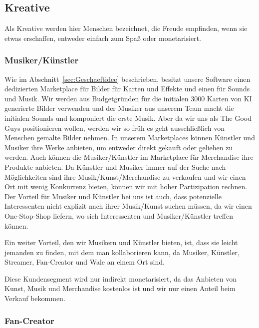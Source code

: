 \documentclass[fontsize=12, a4aper]{scrartcl}
\begin{document}
\subsection{Kreative} \label{subsec:Kreative}

Als Kreative werden hier Menschen bezeichnet, die Freude empfinden, wenn sie etwas erschaffen, entweder einfach zum Spaß oder monetarisiert.

\subsubsection{Musiker/Künstler} \label{subsubsec:Musiker_Kuenstler}

Wie im Abschnitt~\ref{sec:Geschaeftidee} beschrieben, besitzt unsere Software einen dedizierten Marketplace für Bilder für Karten und Effekte und einen für Sounds und Musik. Wir werden aus Budgetgründen für die initialen 3000 Karten von KI generierte Bilder verwenden und der Musiker aus unserem Team macht die initialen Sounds und komponiert die erste Musik. Aber da wir uns als \glqq The Good Guys\grqq{} positionieren wollen, werden wir so früh es geht ausschließlich von Menschen gemalte Bilder nehmen. In unserem Marketplaces können Künstler und Musiker ihre Werke anbieten, um entweder direkt gekauft oder geliehen zu werden. Auch können die Musiker/Künstler im Marketplace für Merchandise ihre Produkte anbieten. Da Künstler und Musiker immer auf der Suche nach Möglichkeiten sind ihre Musik/Kunst/Merchandise zu verkaufen und wir einen Ort mit wenig Konkurrenz bieten, können wir mit hoher Partizipation rechnen. Der Vorteil für Musiker und Künstler bei uns ist auch, dass potenzielle Interessenten nicht explizit nach ihrer Musik/Kunst suchen müssen, da wir einen One-Stop-Shop liefern, wo sich Interessenten und Musiker/Künstler treffen können.\hfill\newline

\noindent Ein weiter Vorteil, den wir Musikern und Künstler bieten, ist, dass sie leicht jemanden zu finden, mit dem man kollaborieren kann, da Musiker, Künstler, Streamer, Fan-Creator und Wale an einem Ort sind.\hfill\newline

\noindent Diese Kundensegment wird nur indirekt monetarisiert, da das Anbieten von Kunst, Musik und Merchandise kostenlos ist und wir nur einen Anteil beim Verkauf bekommen.

\subsubsection{Fan-Creator} \label{subsubsec:Fan_Creator}
\end{document}
